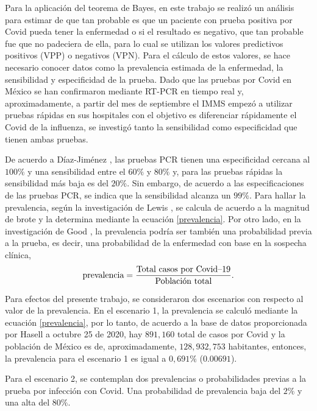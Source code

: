 \documentclass{article}
\begin{document}
Para la aplicación del teorema de Bayes, en este trabajo se realizó un análisis para estimar de que tan probable es que un paciente con prueba positiva por Covid pueda tener la enfermedad o si el resultado es negativo, que tan probable fue que no padeciera de ella, para lo cual se utilizan los valores predictivos positivos (VPP) o negativos (VPN). Para el cálculo de estos valores, se hace necesario conocer datos como la prevalencia estimada de la enfermedad, la sensibilidad y especificidad de la prueba. Dado que las pruebas por Covid en México se han confirmaron mediante RT-PCR en tiempo real y, aproximadamente, a partir del mes de septiembre el IMMS empezó a utilizar pruebas rápidas en sus hospitales con el objetivo es diferenciar rápidamente el Covid de la influenza, se investigó tanto la sensibilidad como especificidad que tienen ambas pruebas.

De acuerdo a Díaz-Jiménez \cite{sensibilidad}, las pruebas PCR tienen una especificidad cercana al $100\%$ y una sensibilidad entre el $60\%$ y $80\%$ y, para las pruebas rápidas la sensibilidad más baja es del $20\%$. Sin embargo, de acuerdo a las especificaciones de las pruebas PCR, se indica que la sensibilidad alcanza un $99\%$. Para hallar la prevalencia, según la investigación de Lewis \cite{link2}, se calcula de acuerdo a la magnitud de brote y la determina mediante la ecuación \ref{prevalencia}. Por otro lado, en la investigación de Good \cite{link4}, la prevalencia podría ser también una probabilidad previa a la prueba, es decir, una probabilidad de la enfermedad con base en la sospecha clínica,
\begin{equation}
\text{prevalencia}= \frac{\text{Total casos por Covid\textendash 19}}{\text{Población total}}.
\label{prevalencia}
\end{equation}

Para efectos del presente trabajo, se consideraron dos escenarios con respecto al valor de la prevalencia. En el escenario 1, la prevalencia se calculó mediante la ecuación \ref{prevalencia}, por lo tanto, de acuerdo a la base de datos proporcionada por Hasell \cite{basededatos} a octubre 25 de 2020, hay $891,160$ total de casos por Covid y la población de México es de, aproximadamente, $128,932,753$ habitantes, entonces, la prevalencia para el escenario 1 es igual a $0,691\%$ ($0.00691$).

Para el escenario 2, se contemplan dos prevalencias o probabilidades previas a la prueba por infección con Covid. Una probabilidad de prevalencia baja del $2\%$ y una alta del $80\%$.
\end{document}
